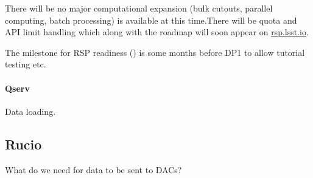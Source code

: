 There will be no major computational expansion (bulk cutouts, parallel computing, batch processing) is available at this time.There will be quota and API limit handling which along with the roadmap will soon appear on \url{rsp.lsst.io}.

The milestone for RSP readiness () is some months before DP1 to allow tutorial testing etc.


\paragraph{Qserv}
Data loading.


\subsection{Rucio}
What do we need for data to be sent to DACs?


